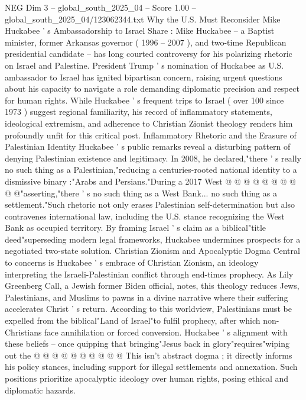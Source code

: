 \begin{textsample}{NEG Dim 3 – global\_south\_2025\_04 – Score 1.00 – global\_south\_2025\_04/123062344.txt}  \label{ex:f3_neg_339}
Why the U.S.
Must Reconsider Mike Huckabee ' s Ambassadorship to Israel Share : Mike Huckabee -- a Baptist minister, former Arkansas governor ( 1996 -- 2007 ), and two-time Republican presidential candidate -- has long courted controversy for his polarizing rhetoric on Israel and Palestine.
President Trump ' s nomination of Huckabee as U.S. ambassador to Israel has ignited bipartisan concern, raising urgent questions about his capacity to navigate a role demanding diplomatic precision and respect for human rights.
While Huckabee ' s frequent trips to Israel ( over 100 since 1973 ) suggest regional familiarity, his record of inflammatory statements, ideological extremism, and adherence to Christian Zionist theology renders him profoundly unfit for this critical post.
Inflammatory Rhetoric and the Erasure of Palestinian Identity Huckabee ' s public remarks reveal a disturbing pattern of denying Palestinian existence and legitimacy.
In 2008, he declared,"there ' s really no such thing as a Palestinian,"reducing a centuries-rooted national identity to a dismissive binary :"Arabs and Persians."During a 2017 West @ @ @ @ @ @ @ @ @ @"asserting,"there ' s no such thing as a West Bank... no such thing as a settlement."Such rhetoric not only erases Palestinian self-determination but also contravenes international law, including the U.S. stance recognizing the West Bank as occupied territory.
By framing Israel ' s claim as a biblical"title deed"superseding modern legal frameworks, Huckabee undermines prospects for a negotiated two-state solution.
Christian Zionism and Apocalyptic Dogma Central to concerns is Huckabee ' s embrace of Christian Zionism, an ideology interpreting the Israeli-Palestinian conflict through end-times prophecy.
As Lily Greenberg Call, a Jewish former Biden official, notes, this theology reduces Jews, Palestinians, and Muslims to pawns in a divine narrative where their suffering accelerates Christ ' s return.
According to this worldview, Palestinians must be expelled from the biblical"Land of Israel"to fulfil prophecy, after which non-Christians face annihilation or forced conversion.
Huckabee ' s alignment with these beliefs -- once quipping that bringing"Jesus back in glory"requires"wiping out the @ @ @ @ @ @ @ @ @ @ This isn't abstract dogma ; it directly informs his policy stances, including support for illegal settlements and annexation.
Such positions prioritize apocalyptic ideology over human rights, posing ethical and diplomatic hazards.

\end{textsample}
